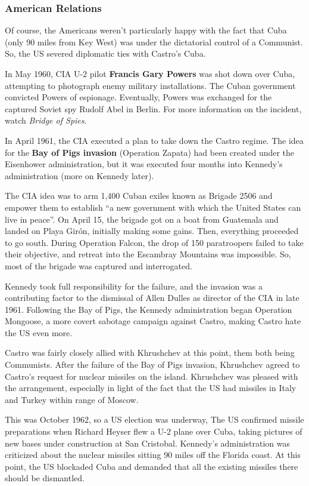 \subsubsection*{American Relations}

Of course, the Americans weren't particularly happy with the fact that Cuba
(only 90 miles from Key West)
was under the dictatorial control of a Communist.
So, the US severed diplomatic ties with Castro's Cuba.

In May 1960, CIA U-2 pilot \textbf{Francis Gary Powers} was shot down over Cuba,
attempting to photograph enemy military installations.
The Cuban government convicted Powers of espionage.
Eventually, Powers was exchanged for the captured Soviet spy Rudolf Abel in Berlin.
For more information on the incident, watch \textit{Bridge of Spies}.

In April 1961, the CIA executed a plan to take down the Castro regime.
The idea for the \textbf{Bay of Pigs invasion} (Operation Zapata)
had been created under the Eisenhower administration,
but it was executed four months into Kennedy's administration (more on Kennedy later).

The CIA idea was to arm 1,400 Cuban exiles known as Brigade 2506
and empower them to establish ``a new government with which the United States can live in peace''.
On April 15, the brigade got on a boat from Guatemala and landed on Playa Gir\'on,
initially making some gains.
Then, everything proceeded to go south.
During Operation Falcon, the drop of 150 paratroopers failed to take their objective,
and retreat into the Escambray Mountains was impossible.
So, most of the brigade was captured and interrogated.

Kennedy took full responsibility for the failure,
and the invasion was a contributing factor to the dismissal
of Allen Dulles as director of the CIA in late 1961.
Following the Bay of Pigs, the Kennedy administration began Operation Mongoose,
a more covert sabotage campaign against Castro, making Castro hate the US even more.

Castro was fairly closely allied with Khrushchev at this point, them both being Communists.
After the failure of the Bay of Pigs invasion,
Khrushchev agreed to Castro's request for nuclear missiles on the island.
Khrushchev was pleased with the arrangement,
especially in light of the fact that the US had missiles in Italy and Turkey within range of Moscow.

This was October 1962, so a US election was underway,
The US confirmed missile preparations when Richard Heyser flew a U-2 plane over Cuba,
taking pictures of new bases under construction at San Cristobal.
Kennedy's administration was criticized
about the nuclear missiles sitting 90 miles off the Florida coast.
At this point,
the US blockaded Cuba and demanded that all the existing missiles there should be dismantled.

